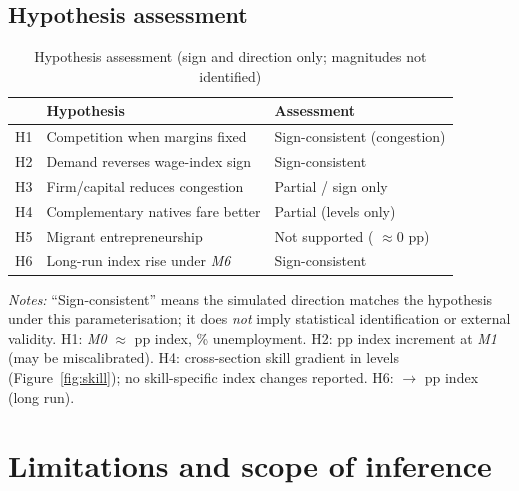 \documentclass[11pt,a4paper]{article}
\begin{document}
\subsection{Hypothesis assessment}

\begin{table}[htbp]
  \centering
  \small
  \caption{Hypothesis assessment (sign and direction only; magnitudes not identified)}
  \label{tab:hypotheses}
  \begin{tabular}{@{}clp{}@{}}
    \toprule
    & Hypothesis & Assessment \\
    \midrule
    H1 & Competition when margins fixed & Sign-consistent (congestion) \\
    H2 & Demand reverses wage-index sign & Sign-consistent \\
    H3 & Firm/capital reduces congestion & Partial / sign only \\
    H4 & Complementary natives fare better & Partial (levels only) \\
    H5 & Migrant entrepreneurship & Not supported ( $\approx 0$ pp) \\
    H6 & Long-run index rise under \emph{M6} & Sign-consistent \\
    \bottomrule
  \end{tabular}
  \begin{minipage}{0.95\textwidth}
    \small\emph{Notes:} ``Sign-consistent'' means the simulated direction matches the hypothesis under this parameterisation; it does \emph{not} imply statistical identification or external validity.
    H1: \emph{M0} $\approx$ \MZeroShortWage{} pp index, \MZeroUnempShort{}\% unemployment.
    H2: \DemandContrib{} pp index increment at \emph{M1} (may be miscalibrated).
    H4: cross-section skill gradient in levels (Figure~\ref{fig:skill}); no skill-specific index changes reported.
    H6: \MZeroLongWage{} $\rightarrow$ \MSixLongWage{} pp index (long run).
  \end{minipage}
\end{table}

\section{Limitations and scope of inference}
\label{sec:limits}
\end{document}
